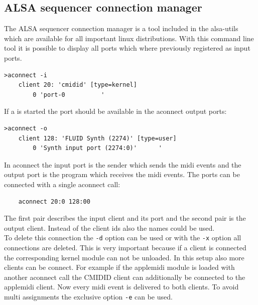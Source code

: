 \documentclass[paper=a4,fontsize=11pt,twocolumn,pagesize,bibtotoc]{scrartcl}
\begin{document}
\subsection{ALSA sequencer connection manager}
\label{aconnect}
The ALSA sequencer connection manager is a tool included in the alsa-utils which are available for all important linux distributions. With this command line tool it is possible to display all ports which where previously registered as input ports.
\begin{lstlisting}
>aconnect -i
	client 20: 'cmidid' [type=kernel]
		0 'port-0          '
\end{lstlisting}
If a  is started the port should be available in the aconnect output ports:
\begin{lstlisting}
>aconnect -o
	client 128: 'FLUID Synth (2274)' [type=user]
		0 'Synth input port (2274:0)'      '
\end{lstlisting}
In aconnect the input port is the sender which sends the midi events and the output port is the program which receives the midi events. The ports can be connected with a single aconnect call:
\begin{lstlisting}
	aconnect 20:0 128:00
\end{lstlisting}
The first pair describes the input client and its port and the second pair is the output client. Instead of the client ids also the names could be used.\\
To delete this connection the \texttt{-d} option can be used or with the \texttt{-x} option all connections are deleted. This is very important because if a client is connected the corresponding kernel module can not be unloaded. In this setup also more clients can be connect. For example if the applemidi module is loaded with another aconnect call the CMIDID client can additionally be connected to the applemidi client. Now every midi event is delivered to both clients. To avoid multi assignments the exclusive option \texttt{-e} can be used.
\end{document}
